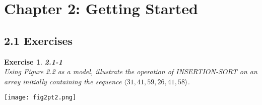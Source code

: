 \documentclass[12pt]{article}
\newtheorem{exercise}[theorem]{Exercise}
\theoremstyle{definition}
\begin{document}
\newpage

\dotfill
\section*{Chapter 2: Getting Started}
\dotfill

\vspace{1em}

\subsection*{2.1 Exercises}


\begin{exercise}
\noindent
\textbf{2.1-1}\\
\noindent
Using Figure 2.2 as a model, illustrate the operation of INSERTION-SORT on
an array initially containing the sequence $\langle 31, 41, 59, 26, 41, 58 \rangle$.
\end{exercise}

\begin{center}
    \texttt{[image: fig2pt2.png]}
\end{center}

\vspace{1pt}
\end{document}
